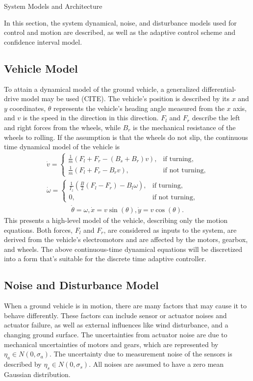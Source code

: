 \begin{section}{System Models and Architecture}
	
\label{sec:modeling}
In this section, the system dynamical, noise, and disturbance models used for control and motion are described, as well as the adaptive control scheme and confidence interval model.


\subsection{Vehicle Model}
To attain a dynamical model of the ground vehicle, a generalized differential-drive model may be used (CITE). The vehicle's position is described by its $x$ and $y$ coordinates, $\theta$ represents the vehicle's heading angle measured from the $x$ axis, and $v$ is the speed in the direction in this direction. $F_l$ and $F_r$ describe the left and right forces from the wheels, while $B_r$ is the mechanical resistance of the wheels to rolling. If the assumption is that the wheels do not slip, the continuous time dynamical model of the vehicle is
    \begin{align}
        \dot{v}=\begin{cases}
            \frac{1}{m}(F_l+F_r-(B_s+B_r)v), & \text{if turning},\\
            \frac{1}{m}(F_l+F_r-B_rv), & \text{if not turning},
        \end{cases}\\
        \dot{\omega}=\begin{cases}
            \frac{1}{I_z}(\frac{B}{2}(F_l-F_r)-B_l\omega), &\text{if turning},\\
            0, & \text{if not turning},
        \end{cases}
	\end{align}
	\begin{align}
        \dot{\theta}=\omega, \dot{x}=v\sin(\theta), \dot{y}=v\cos(\theta).
	\end{align}
This presents a high-level model of the vehicle, describing only the motion equations. Both forces, $F_l$ and $F_r$, are considered as inputs to the system, are derived from the vehicle's electromotors and are affected by the motors, gearbox, and wheels. The above continuous-time dynamical equations will be discretized into a form that's suitable for the discrete time adaptive controller.

 \subsection{Noise and Disturbance Model}
When a ground vehicle is in motion, there are many factors that may cause it to behave differently. These factors can include sensor or actuator noises and actuator failure, as well as external influences like wind disturbance, and a changing ground surface. The uncertainties from actuator noise are due to mechanical uncertainties of motors and gears, which are represented by $ \eta_a \in N(0,\sigma_a) $. The uncertainty due to measurement noise of the sensors is described by $ \eta_s \in N(0,\sigma_s) $. All noises are assumed to have a zero mean Gaussian distribution.



\end{section}
